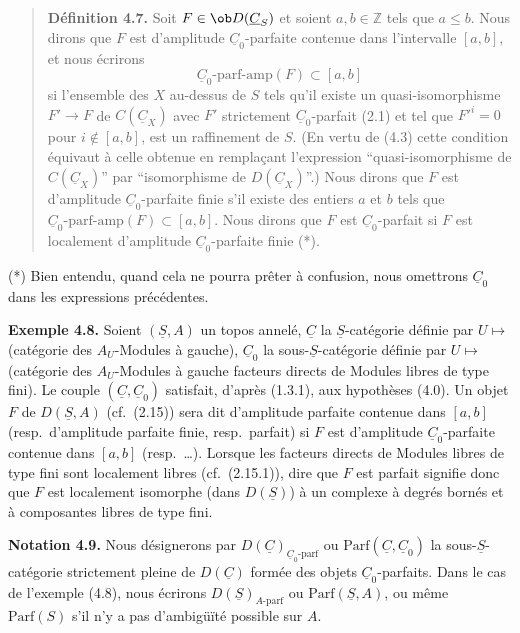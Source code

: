 \begin{quote}
\textbf{Définition 4.7.} Soit $F \in \ob D(\underline{C}_S)$ et soient $a, b \in \mathbb{Z}$ tels que $a \leqslant b$. Nous dirons que $F$ est d'amplitude $\underline{C}_0$-parfaite contenue dans l'intervalle $[a, b]$, et nous écrirons
\[
\underline{C}_0\text{-parf-amp}(F) \subset [a, b]
\]
si l'ensemble des $X$ au-dessus de $S$ tels qu'il existe un quasi-isomorphisme $F' \to F$ de $C(\underline{C}_X)$ avec $F'$ strictement $\underline{C}_0$-parfait (2.1) et tel que $F'^i = 0$ pour $i \notin [a, b]$, est un raffinement de $S$. (En vertu de (4.3) cette condition équivaut à celle obtenue en remplaçant l'expression ``quasi-isomorphisme de $C(\underline{C}_X)$'' par ``isomorphisme de $D(\underline{C}_X)$''.) Nous dirons que $F$ est d'amplitude $\underline{C}_0$-parfaite finie s'il existe des entiers $a$ et $b$ tels que $\underline{C}_0\text{-parf-amp}(F) \subset [a, b]$. Nous dirons que $F$ est $\underline{C}_0$-parfait si $F$ est localement d'amplitude $\underline{C}_0$-parfaite finie (*).
\end{quote}

(*) Bien entendu, quand cela ne pourra prêter à confusion, nous omettrons $\underline{C}_0$ dans les expressions précédentes.

\textbf{Exemple 4.8.} Soient $(\underline{S}, A)$ un topos annelé, $\underline{C}$ la $\underline{S}$-catégorie définie par $U \mapsto$ (catégorie des $A_U$-Modules à gauche), $\underline{C}_0$ la sous-$\underline{S}$-catégorie définie par $U \mapsto$ (catégorie des $A_U$-Modules à gauche facteurs directs de Modules libres de type fini). Le couple $(\underline{C}, \underline{C}_0)$ satisfait, d'après (1.3.1), aux hypothèses (4.0). Un objet $F$ de $D(\underline{S}, A)$ (cf.\ (2.15)) sera dit d'amplitude parfaite contenue dans $[a, b]$ (resp.\ d'amplitude parfaite finie, resp.\ parfait) si $F$ est d'amplitude $\underline{C}_0$-parfaite contenue dans $[a, b]$ (resp.\ \ldots). Lorsque les facteurs directs de Modules libres de type fini sont localement libres (cf.\ (2.15.1)), dire que $F$ est parfait signifie donc que $F$ est localement isomorphe (dans $D(\underline{S})$) à un complexe à degrés bornés et à composantes libres de type fini.

\textbf{Notation 4.9.} Nous désignerons par $D(\underline{C})_{\underline{C}_0\text{-parf}}$ ou $\mathrm{Parf}(\underline{C}, \underline{C}_0)$ la sous-$\underline{S}$-catégorie strictement pleine de $D(\underline{C})$ formée des objets $\underline{C}_0$-parfaits. Dans le cas de l'exemple (4.8), nous écrirons $D(\underline{S})_{A\text{-parf}}$ ou $\mathrm{Parf}(\underline{S}, A)$, ou même $\mathrm{Parf}(S)$ s'il n'y a pas d'ambigüïté possible sur $A$.

